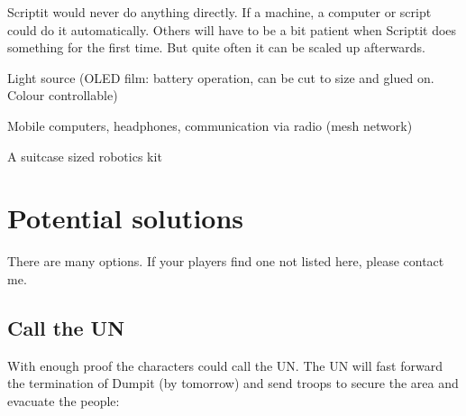 \newpage
\begin{npcBox}[title=Scriptit continued]
    
    \begin{stressSection}
    \end{stressSection}
    \begin{tabularx}{\textwidth}{ XX }
    \end{tabularx}
    
    \begin{consequences}
    \item {}
    \item {}
    \item {}
    \end{consequences}
    
    \begin{npcDescription}
    Scriptit would never do anything directly. If a machine, a computer or script could do it automatically. Others will have to be a bit patient when Scriptit does something for the first time. But quite often it can be scaled up afterwards.

    \end{npcDescription}
    
    \begin{equipment}
        \item Light source (OLED film: battery operation, can be cut to size and glued on. Colour controllable)
        \item Mobile computers, headphones, communication via radio (mesh network)
        \item A suitcase sized robotics kit
    \end{equipment}
\end{npcBox}

\section{Potential solutions}

There are many options. If your players find one not listed here, please contact me.

\subsection{Call the UN}

With enough proof the characters could call the UN. The UN will fast forward the termination of Dumpit (by tomorrow) and send troops to secure the area and evacuate the people:

